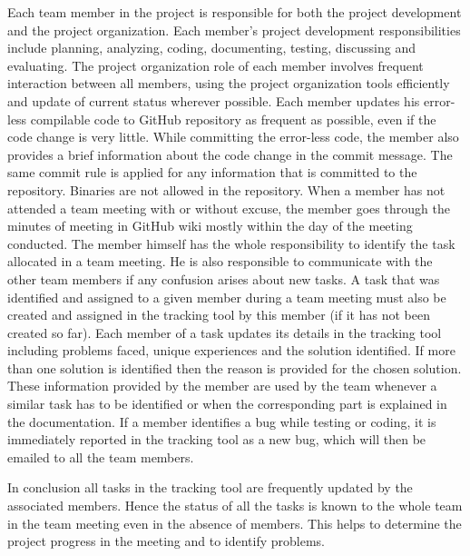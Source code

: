 Each team member in the project is responsible for both the project development and the project organization.
Each member's project development responsibilities include planning, analyzing, coding, documenting, testing, discussing and evaluating.
The project organization role of each member involves frequent interaction between all members, using
the project organization tools efficiently and update of current status wherever possible.
Each member updates his error-less compilable code to GitHub repository as frequent as possible, even if the code change is very little.
While committing the error-less code, the member also provides a brief information about the code change in the commit message.
The same commit rule is applied for any information that is committed to the repository.
Binaries are not allowed in the repository.
When a member has not attended a team meeting with or without excuse, the member
goes through the minutes of meeting in GitHub wiki mostly within the day of the meeting conducted.
The member himself has the whole responsibility to identify the task allocated in a team meeting.
He is also responsible to communicate with the other team members if any confusion arises about new tasks.
A task that was identified and assigned to a given member during a team meeting must also be created and assigned in the tracking tool by this member (if it has not been created so far).
Each member of a task updates its details in the tracking tool including problems faced, unique experiences and the solution identified.
If more than one solution is identified then the reason is provided for the chosen solution.
These information provided by the member are used by the team whenever a similar task has to be identified or when the corresponding part is explained in the documentation.
If a member identifies a bug while testing or coding, it is immediately reported in the tracking tool as a new bug, which will then be emailed to all the team members.

In conclusion all tasks in the tracking tool are frequently updated by the associated members.
Hence the status of all the tasks is known to the whole team in the team meeting even in the absence of members.
This helps to determine the project progress in the meeting and to identify problems.

\vspace{1cm}


